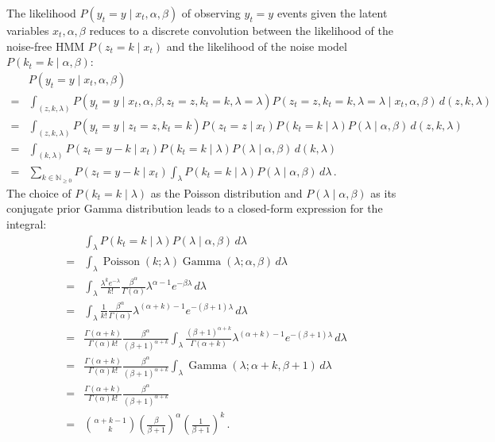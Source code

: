 \documentclass[twoside, 11pt]{article}
\DeclareMathOperator*{\gammad}{Gamma}
\DeclareMathOperator*{\poissond}{Poisson}
\newcommand{\nonnegint}[0] {\mathbb{N}_{\geq 0}}
\begin{document}
The likelihood $P(y_t=y \mid x_t, \alpha, \beta)$ of observing $y_t=y$ events given the latent variables $x_t, \alpha, \beta$ reduces to a discrete convolution between the likelihood of the noise-free HMM $P(z_t=k \mid x_t)$ and the likelihood of the noise model $P(k_t=k \mid \alpha, \beta)$:
\begin{align}
& P(y_t=y \mid x_t, \alpha, \beta) \nonumber \\
= & \int_{(z, k, \lambda)} P(y_t=y \mid x_t, \alpha, \beta, z_t=z, k_t=k, \lambda=\lambda) P(z_t=z, k_t=k, \lambda=\lambda \mid x_t, \alpha, \beta) \, d(z, k, \lambda) \nonumber \\
= & \int_{(z, k, \lambda)}
P(y_t=y \mid z_t=z, k_t=k)
P(z_t=z \mid x_t)
P(k_t=k \mid \lambda)
P(\lambda \mid \alpha, \beta)
\, d(z, k, \lambda) \nonumber \\
= & \int_{(k, \lambda)}
P(z_t=y-k \mid x_t)
P(k_t=k \mid \lambda)
P(\lambda \mid \alpha, \beta)
\, d(k, \lambda) \nonumber \\
= & \sum_{k \in \nonnegint} P(z_t = y-k \mid x_t)
\int_{\lambda} P(k_t = k \mid \lambda) P(\lambda \mid \alpha, \beta) \, d \lambda \, .
\end{align}
The choice of $P(k_t = k \mid \lambda)$ as the Poisson distribution and $P(\lambda \mid \alpha, \beta)$ as its conjugate prior Gamma distribution leads to a closed-form expression for the integral:
\begin{align}
& \int_{\lambda}
P(k_t = k \mid \lambda) P(\lambda \mid \alpha, \beta)
\, d \lambda \nonumber \\
= & \int_{\lambda}
\poissond( k ; \lambda) \gammad( \lambda ; \alpha, \beta)
\, d \lambda \nonumber \\
= & \int_{\lambda}
\frac{\lambda^k e^{-\lambda}}{k!}
\frac{\beta^{\alpha}}{\Gamma(\alpha)}
\lambda^{\alpha-1} e^{-\beta \lambda}
\, d \lambda \nonumber \\
= & \int_{\lambda}
\frac{1}{k!}
\frac{\beta^{\alpha}}{\Gamma(\alpha)}
\lambda^{(\alpha+k)-1} e^{-(\beta+1) \lambda}
\, d \lambda \nonumber \\
= &
\frac{\Gamma(\alpha+k)}{\Gamma(\alpha) k!}
\frac{\beta^{\alpha}}{(\beta+1)^{\alpha+k}}
\int_{\lambda}
\frac{(\beta+1)^{\alpha+k}}{\Gamma(\alpha+k)}
\lambda^{(\alpha+k)-1} e^{-(\beta+1) \lambda}
\, d \lambda \nonumber \\
= &
\frac{\Gamma(\alpha+k)}{\Gamma(\alpha) k!}
\frac{\beta^{\alpha}}{(\beta+1)^{\alpha+k}}
\int_{\lambda}
\gammad(\lambda ; \alpha+k, \beta+1)
\, d \lambda \nonumber \\
= &
\frac{\Gamma(\alpha+k)}{\Gamma(\alpha) k!}
\frac{\beta^{\alpha}}{(\beta+1)^{\alpha+k}}
\nonumber \\
= &
\binom{\alpha+k-1}{k} \left( \frac{\beta}{\beta+1} \right)^{\alpha} \left( \frac{1}{\beta+1} \right)^{k} \, .
\end{align}
\end{document}
